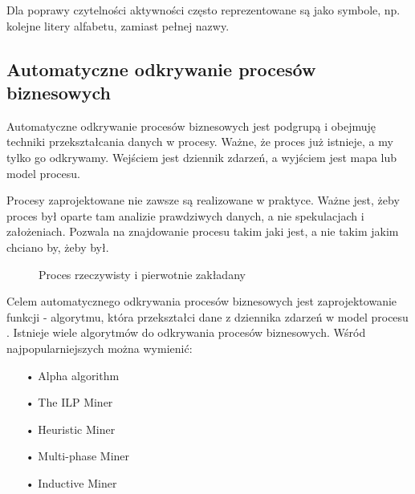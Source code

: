 Dla poprawy czytelności aktywności często reprezentowane są jako symbole, np. kolejne litery alfabetu, zamiast pełnej nazwy.

\subsection{Automatyczne odkrywanie procesów biznesowych}
\label{sec:discovery}

Automatyczne odkrywanie procesów biznesowych jest podgrupą i obejmuję techniki przekształcania danych w procesy. Ważne, że proces już istnieje, a my tylko go odkrywamy. Wejściem jest dziennik zdarzeń, a wyjściem jest mapa lub model procesu.

Procesy zaprojektowane nie zawsze są realizowane w praktyce. Ważne jest, żeby proces był oparte tam analizie prawdziwych danych, a nie spekulacjach i założeniach. Pozwala na znajdowanie procesu takim jaki jest, a nie takim jakim chciano by, żeby był.

\begin{figure}[h]
	\caption{\label{fig:subcaption_example}Proces rzeczywisty i pierwotnie zakładany}
\end{figure}

Celem automatycznego odkrywania procesów biznesowych jest zaprojektowanie funkcji - algorytmu, która przekształci dane z dziennika zdarzeń w model procesu \cite{pm-book}. Istnieje wiele algorytmów do odkrywania procesów biznesowych. Wśród najpopularniejszych można wymienić:
\begin{itemize}
  \item[•] Alpha algorithm \cite{alpha-algorithm}
  \item[•] The ILP Miner \cite{ILP-miner}
  \item[•] Heuristic Miner \cite{heuristics-miner}
  \item[•] Multi-phase Miner \cite{multi-phase-miner}
  \item[•] Inductive Miner \cite{inductive-miner}
\end{itemize}

